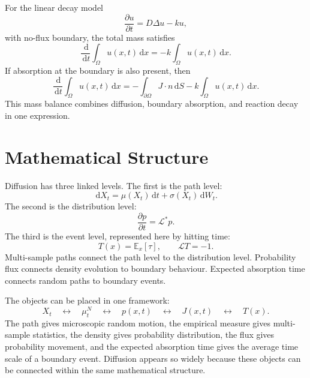 \documentclass[11pt,a4paper]{article}
\numberwithin{equation}{section}
\newcommand{\E}{\mathbb{E}}
\newcommand{\dd}{\,\mathrm{d}}
\begin{document}
For the linear decay model
\begin{equation}
  \frac{\partial u}{\partial t}=D\Delta u-ku,
  \label{eq:diffusion-decay}
\end{equation}
with no-flux boundary, the total mass satisfies
\begin{equation}
  \frac{\dd}{\dd t}\int_{\Omega}u(x,t)\dd x
  =
  -k\int_{\Omega}u(x,t)\dd x.
  \label{eq:decay-mass-balance}
\end{equation}
If absorption at the boundary is also present, then
\begin{equation}
  \frac{\dd}{\dd t}\int_{\Omega}u(x,t)\dd x
  =
  -\int_{\partial\Omega}J\cdot n\dd S
  -k\int_{\Omega}u(x,t)\dd x.
  \label{eq:boundary-reaction-mass-balance}
\end{equation}
This mass balance combines diffusion, boundary absorption, and reaction decay in one expression.

\section{Mathematical Structure}

Diffusion has three linked levels. The first is the path level:
\begin{equation}
  \dd X_t=\mu(X_t)\dd t+\sigma(X_t)\dd W_t.
  \label{eq:summary-path}
\end{equation}
The second is the distribution level:
\begin{equation}
  \frac{\partial p}{\partial t}=\mathcal{L}^*p.
  \label{eq:summary-distribution}
\end{equation}
The third is the event level, represented here by hitting time:
\begin{equation}
  T(x)=\E_x[\tau],
  \qquad
  \mathcal{L}T=-1.
  \label{eq:summary-event}
\end{equation}
Multi-sample paths connect the path level to the distribution level. Probability flux connects density evolution to boundary behaviour. Expected absorption time connects random paths to boundary events.

The objects can be placed in one framework:
\begin{equation}
  X_t
  \quad\longleftrightarrow\quad
  \mu_t^N
  \quad\longleftrightarrow\quad
  p(x,t)
  \quad\longleftrightarrow\quad
  J(x,t)
  \quad\longleftrightarrow\quad
  T(x).
  \label{eq:object-chain}
\end{equation}
The path gives microscopic random motion, the empirical measure gives multi-sample statistics, the density gives probability distribution, the flux gives probability movement, and the expected absorption time gives the average time scale of a boundary event. Diffusion appears so widely because these objects can be connected within the same mathematical structure.
\end{document}
